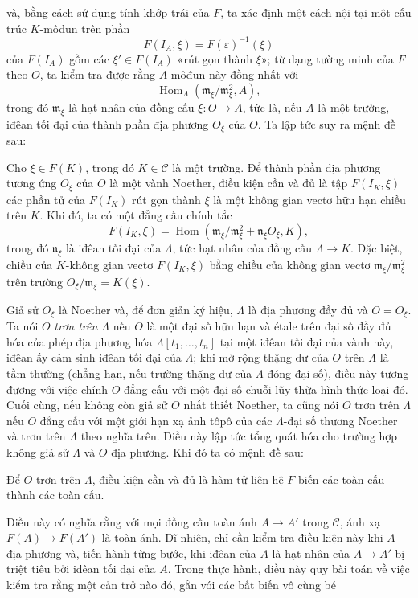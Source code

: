 và, bằng cách sử dụng tính khớp trái của $F$, ta xác định một cách nội tại
một cấu trúc $K$-môđun trên phần
\[
  F(I_A,\xi)=F(\varepsilon)^{-1}(\xi)
\]
của $F(I_A)$ gồm các $\xi'\in F(I_A)$ «rút gọn thành $\xi$»; từ dạng tường
minh của $F$ theo $O$, ta kiểm tra được rằng $A$-môđun này đồng nhất với
\[
  \operatorname{Hom}_{\Lambda}(\mathfrak m_\xi/\mathfrak m_\xi^2,A),
\]
trong đó $\mathfrak m_\xi$ là hạt nhân của đồng cấu
$\xi:O\longrightarrow A$, tức là, nếu $A$ là một trường, iđêan tối đại của
thành phần địa phương $O_\xi$ của $O$. Ta lập tức suy ra mệnh đề sau:

 Cho $\xi\in F(K)$, trong đó $K\in\mathcal C$ là một
trường. Để thành phần địa phương tương ứng $O_\xi$ của $O$ là một vành
Noether, điều kiện cần và đủ là tập $F(I_K,\xi)$ các phần tử của $F(I_K)$ rút
gọn thành $\xi$ là một không gian vectơ hữu hạn chiều trên $K$. Khi đó, ta có
một đẳng cấu chính tắc
\[
  F(I_K,\xi)=
  \operatorname{Hom}\!\left(
    \mathfrak m_\xi/\mathfrak m_\xi^2+\mathfrak n_\xi O_\xi,K
  \right),
\]
trong đó $\mathfrak n_\xi$ là iđêan tối đại của $\Lambda$, tức hạt nhân của
đồng cấu $\Lambda\longrightarrow K$.
Đặc biệt, chiều của $K$-không gian vectơ $F(I_K,\xi)$ bằng chiều của không
gian vectơ $\mathfrak m_\xi/\mathfrak m_\xi^2$ trên trường
$O_\xi/\mathfrak m_\xi=K(\xi)$.

Giả sử $O_\xi$ là Noether và, để đơn giản ký hiệu, $\Lambda$ là địa phương
đầy đủ và $O=O_\xi$. Ta nói $O$ \emph{trơn trên $\Lambda$} nếu $O$ là một
đại số hữu hạn và étale trên đại số đầy đủ hóa của phép địa phương hóa
$\Lambda[t_1,\ldots,t_n]$ tại một iđêan tối đại của vành này, iđêan ấy cảm
sinh iđêan tối đại của $\Lambda$; khi mở rộng thặng dư của $O$ trên
$\Lambda$ là tầm thường (chẳng hạn, nếu trường thặng dư của $\Lambda$ đóng
đại số), điều này tương đương với việc chính $O$ đẳng cấu với một đại số
chuỗi lũy thừa hình thức loại đó.
Cuối cùng, nếu không còn giả sử $O$ nhất thiết Noether, ta cũng nói $O$ trơn
trên $\Lambda$ nếu $O$ đẳng cấu với một giới hạn xạ ảnh tôpô của các
$\Lambda$-đại số thương Noether và trơn trên $\Lambda$ theo nghĩa trên. Điều
này lập tức tổng quát hóa cho trường hợp không giả sử $\Lambda$ và $O$ địa
phương. Khi đó ta có mệnh đề sau:

 Để $O$ trơn trên $\Lambda$, điều kiện cần và đủ là hàm
tử liên hệ $F$ biến các toàn cấu thành các toàn cấu.

Điều này có nghĩa rằng với mọi đồng cấu toàn ánh
$A\longrightarrow A'$ trong $\mathcal C$, ánh xạ
$F(A)\longrightarrow F(A')$ là toàn ánh. Dĩ nhiên, chỉ cần kiểm tra điều kiện
này khi $A$ địa phương và, tiến hành từng bước, khi iđêan của $A$ là hạt nhân
của $A\longrightarrow A'$ bị triệt tiêu bởi iđêan tối đại của $A$. Trong
thực hành, điều này quy bài toán về việc kiểm tra rằng một cản trở nào đó,
gắn với các bất biến vô cùng bé

